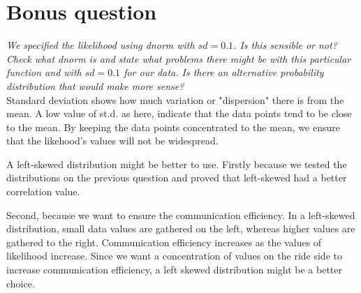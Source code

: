 \documentclass[11pt,a4paper,oneside]{article}
\begin{document}
\section{Bonus question}
\label{bonus}
\textit{We specified the likelihood using dnorm with $sd=0.1$. Is this sensible or not? Check what dnorm is and state what problems there might be with this particular function and with $sd=0.1$ for our data. Is there an alternative probability distribution that would make more sense?}\\

Standard deviation shows how much variation or "dispersion" there is from the mean. A low value of st.d. as here, indicate that the data points tend to be close to the mean. By keeping the data points concentrated to the mean, we ensure that the likehood's values will not be widespread. 


A left-skewed distribution might be better to use. Firstly because we tested the distributions on the previous question and proved that left-skewed had a better correlation value.

Second, because we want to ensure the communication efficiency. In a left-skewed distribution, small data values are gathered on the left, whereas higher values are gathered to the right. Communication efficiency increases as the values of likelihood increase. Since we want a concentration of values on the ride side to increase communication efficiency, a left skewed distribution might be a better choice.

\clearpage 
\printbibliography
\end{document}

